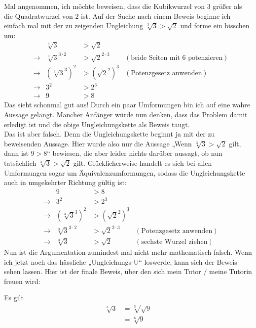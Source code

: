\begin{bem} \label{hintennachvorne}
 Mal angenommen, ich möchte beweisen, dass die Kubikwurzel von $3$ größer als die Quadratwurzel von $2$ ist. Auf der Suche nach einem Beweis beginne ich einfach mal mit der zu zeigenden Ungleichung $\sqrt[3]{3}>\sqrt{2}$ und forme ein bisschen um:
 \begin{align*}
 && \sqrt[3]{3}& >\sqrt{2} \\
  & \to& \sqrt[3]{3}^{3\cdot 2} & > \sqrt{2}^{2\cdot 3} & (\text{beide Seiten mit $6$ potenzieren}) \\
  & \to & (\sqrt[3]{3}^3)^2 & > (\sqrt{2}^2)^3 & (\text{Potenzgesetz anwenden})\\
  & \to & 3^2 & > 2^3 \\
  & \to & 9 & > 8
 \end{align*}
Das sieht schonmal gut aus! Durch ein paar Umformungen bin ich auf eine wahre Aussage gelangt. Mancher Anfänger würde nun denken, dass das Problem damit erledigt ist und die obige Ungleichungskette als Beweis taugt. \\
Das ist aber falsch. Denn die Ungleichungskette beginnt ja mit der zu beweisenden Aussage. Hier wurde also nur die Aussage „Wenn $\sqrt[3]{3} >\sqrt{2}$ gilt, dann ist $9>8$“ bewiesen, die aber leider nichts darüber aussagt, ob nun tatsächlich $\sqrt[3]{3} >\sqrt{2}$ gilt. Glücklicherweise handelt es sich bei allen Umformungen sogar um Äquivalenzumformungen, sodass die Ungleichungskette auch in umgekehrter Richtung gültig ist:
 \begin{align*}
   && 9 & > 8 \\
  & \to & 3^2 & > 2^3 \\
  & \to & (\sqrt[3]{3}^3)^2 & > (\sqrt{2}^2)^3 \\
  & \to& \sqrt[3]{3}^{3\cdot 2} & > \sqrt{2}^{2\cdot 3} & (\text{Potenzgesetz anwenden}) \\
 &\to &  \sqrt[3]{3}& >\sqrt{2}  & (\text{sechste Wurzel ziehen})
 \end{align*}
 Nun ist die Argumentation zumindest mal nicht mehr mathematisch falsch. Wenn ich jetzt noch das hässliche „Ungleichungs-U“ loswerde, kann sich der Beweis sehen lassen. Hier ist der finale Beweis, über den sich mein Tutor / meine Tutorin freuen wird:
 \begin{bew}
  Es gilt
   \begin{align*}
 \sqrt[3]{3} & = \sqrt[3]{\sqrt{9}} \\
& = \sqrt[6]{9} \\

\end{align*}
\end{bew}
\end{bem}
